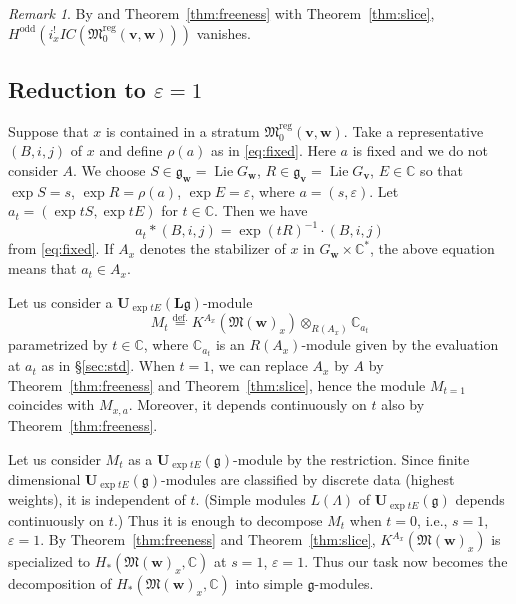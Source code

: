 \documentclass[12pt]{amsart}
\def\Bbb{\mathbb}
\def\frak{\mathfrak}
\theoremstyle{definition}
\theoremstyle{remark}
\newtheorem{Remark}[equation]{Remark}
\numberwithin{equation}{subsection}
\newcommand{\thmref}[1]{Theorem~\ref{#1}}
\newcommand{\secref}[1]{\S\ref{#1}}
\newcommand{\defeq}{\overset{\operatorname{\scriptstyle def.}}{=}}
\newcommand{\C}{{\Bbb C}}
\newcommand{\M}{{\frak M}} %
\newcommand{\Mreg}{{\frak M_0^{\operatorname{reg}}}}
\newcommand{\bv}{{\mathbf v}} %
\newcommand{\bw}{{\mathbf w}} %
\newcommand{\Mw}{\M(\bw)}
\begin{document}
\begin{Remark}
By \cite[8.7.8]{Gi-book} and \thmref{thm:freeness} with
\thmref{thm:slice}, $H^{\operatorname{odd}}(i_x^! IC(\Mreg(\bv,\bw)))$
vanishes.
\end{Remark}

\subsection{Reduction to $\varepsilon=1$}
Suppose that $x$ is contained in a stratum $\Mreg(\bv,\bw)$. Take a
representative $(B,i,j)$ of $x$ and define $\rho(a)$ as in
\eqref{eq:fixed}. Here $a$ is fixed and we do not consider $A$. We
choose $S\in\mathfrak g_\bw = \operatorname{Lie} G_\bw$,
$R\in\mathfrak g_\bv = \operatorname{Lie} G_\bv$, $E\in\C$ so that
$\exp S = s$, $\exp R = \rho(a)$, $\exp E = \varepsilon$, where $a =
(s,\varepsilon)$.
%
Let $a_t = (\exp tS, \exp tE)$ for $t\in\C$. Then we have
\begin{equation*}
   a_t \ast (B,i,j) = \exp(tR)^{-1}\cdot (B,i,j)
\end{equation*}
from \eqref{eq:fixed}. If $A_x$ denotes the stabilizer of $x$ in
$G_\bw\times\C^*$, the above equation means that $a_t\in A_x$.

Let us consider a ${\mathbf U}_{\exp tE}({\mathbf L}\mathfrak
g)$-module 
\[
   M_t \defeq K^{A_x}(\Mw_x)\otimes_{R(A_x)} \C_{a_t}
\]
parametrized by $t\in\C$, where $\C_{a_t}$ is an $R(A_x)$-module
given by the evaluation at $a_t$ as in \secref{sec:std}.
%
When $t = 1$, we can replace $A_x$ by $A$ by \thmref{thm:freeness} and
\thmref{thm:slice}, hence the module $M_{t=1}$ coincides with
$M_{x,a}$.
%
Moreover, it depends continuously on $t$ also by
\thmref{thm:freeness}.

Let us consider $M_t$ as a ${\mathbf U}_{\exp tE}(\mathfrak g)$-module
by the restriction. Since finite dimensional ${\mathbf U}_{\exp
tE}(\mathfrak g)$-modules are classified by discrete data (highest
weights), it is independent of $t$.
(Simple modules $L(\Lambda)$ of ${\mathbf U}_{\exp tE}(\mathfrak g)$
depends continuously on $t$.)
Thus it is enough to decompose $M_t$ when $t = 0$, i.e., $s = 1$,
$\varepsilon = 1$.
By \thmref{thm:freeness} and \thmref{thm:slice}, $K^{A_x}(\Mw_x)$ is
specialized to $H_*(\Mw_x,\C)$ at $s=1$, $\varepsilon=1$. Thus our
task now becomes the decomposition of $H_*(\Mw_x,\C)$ into simple
$\mathfrak g$-modules.

\subsection{}
\end{document}
